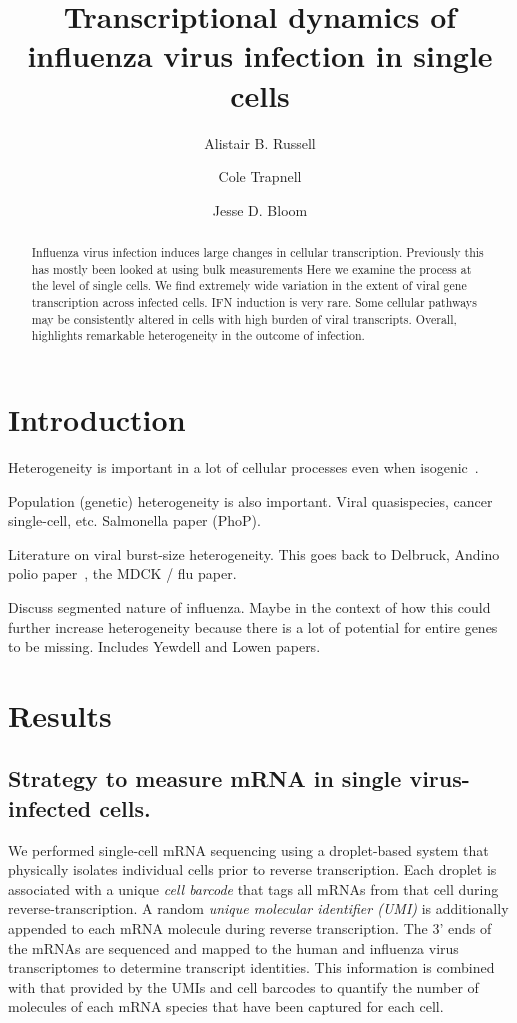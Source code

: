 \documentclass[9pt,lineno]{elife}
\title{Transcriptional dynamics of influenza virus infection in single cells}
\author[1]{Alistair B. Russell}
\author[2]{Cole Trapnell}
\author[1,2*]{Jesse D. Bloom}
\affil[1]{Basic Sciences Division and Computational Biology Program, Fred Hutchinson Cancer Research Center, Seattle, United States}
\affil[2]{Department of Genome Sciences, University of Washington, Seattle, United States}
\begin{document}
\maketitle

\begin{abstract}
Influenza virus infection induces large changes in cellular transcription.
Previously this has mostly been looked at using bulk measurements
Here we examine the process at the level of single cells.
We find extremely wide variation in the extent of viral gene transcription across infected cells.
IFN induction is very rare.
Some cellular pathways may be consistently altered in cells with high burden of viral transcripts.
Overall, highlights remarkable heterogeneity in the outcome of infection.
\end{abstract}


\section{Introduction}

Heterogeneity is important in a lot of cellular processes even when isogenic~\citep{shalek2013single,shalek2014single}.

Population (genetic) heterogeneity is also important. 
Viral quasispecies, cancer single-cell, etc.
Salmonella paper (PhoP).

Literature on viral burst-size heterogeneity.
This goes back to Delbruck, Andino polio paper~\citep{schulte2014single}, the MDCK / flu paper.

Discuss segmented nature of influenza.
Maybe in the context of how this could further increase heterogeneity because there is a lot of potential for entire genes to be missing.
Includes Yewdell and Lowen papers.

\section{Results}

\subsection{Strategy to measure mRNA in single virus-infected cells.}
We performed single-cell mRNA sequencing using a droplet-based system that physically isolates individual cells prior to reverse transcription.
Each droplet is associated with a unique \emph{cell barcode} that tags all mRNAs from that cell during reverse-transcription.
A random \emph{unique molecular identifier (UMI)} is additionally appended to each mRNA molecule during reverse transcription.
The 3' ends of the mRNAs are sequenced and mapped to the human and influenza virus transcriptomes to determine transcript identities.
This information is combined with that provided by the UMIs and cell barcodes to quantify the number of molecules of each mRNA species that have been captured for each cell.
\end{document}

